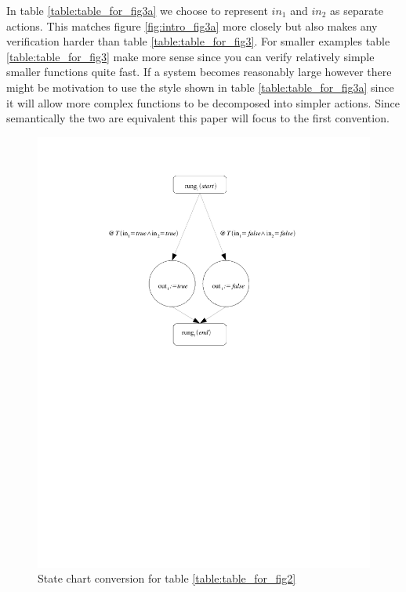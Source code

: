 In table \ref{table:table_for_fig3a} we choose to represent $in_1$ and $in_2$ as separate actions. This matches figure
\ref{fig:intro_fig3a} more closely but also makes any verification harder than table \ref{table:table_for_fig3}. For
smaller examples table \ref{table:table_for_fig3} make more sense since you can verify relatively simple smaller functions
quite fast. If a system becomes reasonably large however there might be motivation to use the style shown in 
table \ref{table:table_for_fig3a} since it will allow more complex functions to be decomposed into simpler actions.
Since semantically the two are equivalent this paper will focus to the first convention.




\pagebreak[4]

\begin{figure}[htp]
    \centering
    \includegraphics[trim= 50mm 140mm 50mm 10mm, clip, width=\imgmedsmall]{./images/intro_and_graph.pdf} %
    \caption{State chart conversion for table \ref{table:table_for_fig2}}
    \label{fig:intro_and_graph}
\end{figure}

